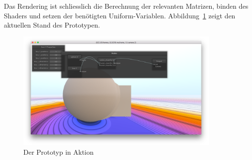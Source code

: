 Das Rendering ist schliesslich die Berechnung der relevanten Matrizen, binden
des Shaders und setzen der benötigten Uniform-Variablen.
Abbildung~\ref{fig:prototype:procedure} zeigt den aktuellen Stand des
Prototypen.

\begin{figure}[H]
    \centering
    \includegraphics[width=0.9\textwidth]{img/prototype.png}
    \caption{Der Prototyp in Aktion}\label{fig:prototype:procedure}
\end{figure}
